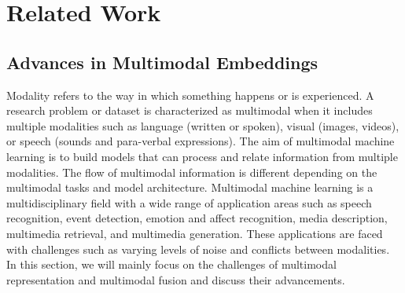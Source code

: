 \documentclass{article}
\newcommand{\todo}[1]{\textbf{\textcolor{Red}{(TODO: #1)}}}
\begin{document}

\section{Related Work}
\subsection{Advances in Multimodal Embeddings} \label{subsection:embeds}
Modality refers to the way in which something happens or is experienced. %
A research problem or dataset is characterized as multimodal when it includes multiple modalities such as language (written or spoken), visual (images, videos), or speech (sounds and para-verbal expressions). The aim of multimodal machine learning is to build models that can process and relate information from multiple modalities. The flow of multimodal information is different depending on the multimodal tasks and model architecture. Multimodal machine learning is a multidisciplinary field with a wide range of application areas such as speech recognition, event detection, emotion and affect recognition, media description, multimedia retrieval, and multimedia generation. These applications are faced with challenges such as varying levels of noise and conflicts between modalities. In this section, we will mainly focus on the challenges of multimodal representation and multimodal fusion and discuss their advancements.
\end{document}
